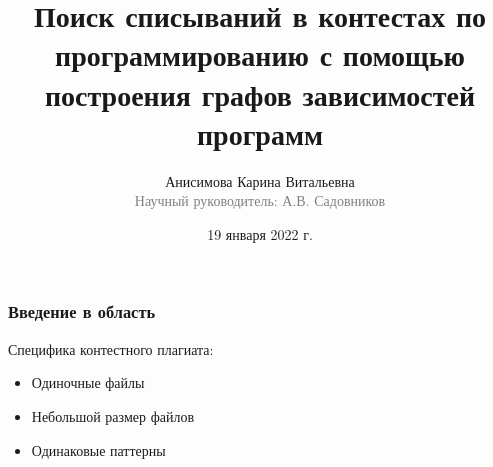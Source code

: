 \documentclass[10pt]{beamer}
\renewcommand{\footnotesize}{\scriptsize}
\begin{document}
\title[Поиск списываний в контестах]{Поиск списываний в контестах по программированию с помощью построения графов зависимостей программ}

\author[Анисимова К.В.]{Анисимова Карина Витальевна\\{\footnotesize\textcolor{gray}{Научный руководитель: А.В. Садовников}}}
\date{19 января 2022 г.}
\frame{\titlepage}

\begin{frame}[fragile]\frametitle{Введение в область}
	Специфика контестного плагиата:
	\begin{itemize}
		\item Одиночные файлы
		\item Небольшой размер файлов
		\item Одинаковые паттерны
	\end{itemize}
\end{frame}
\end{document}
